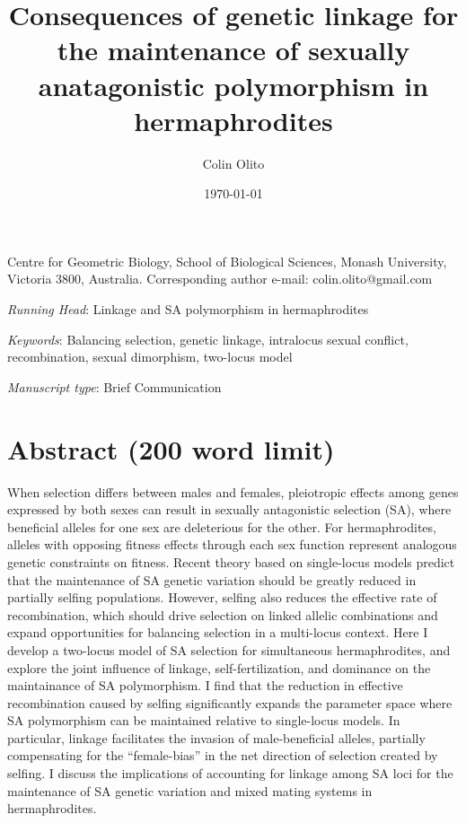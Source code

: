 \documentclass{article}
\title{Consequences of genetic linkage for the maintenance of sexually anatagonistic polymorphism in hermaphrodites}
\author{Colin Olito}
\date{\today}
\begin{document}
\maketitle


\noindent{} Centre for Geometric Biology, School of Biological Sciences, Monash University, Victoria 3800, Australia.
\noindent{} Corresponding author e-mail: colin.olito@gmail.com

\bigskip

\noindent{} \textit{Running Head}: Linkage and SA polymorphism in hermaphrodites

\bigskip

\noindent{} \textit{Keywords}: Balancing selection, genetic linkage, intralocus sexual conflict, recombination, sexual dimorphism, two-locus model

\bigskip

\noindent{} \textit{Manuscript type}: Brief Communication

\bigskip


\linenumbers
\modulolinenumbers[1]
\renewcommand\linenumberfont{\normalfont\small}


\newpage{}
\section*{Abstract (200 word limit)}

\noindent{} When selection differs between males and females, pleiotropic effects among genes expressed by both sexes can result in sexually antagonistic selection (SA), where beneficial alleles for one sex are deleterious for the other. For hermaphrodites, alleles with opposing fitness effects through each sex function represent analogous genetic constraints on fitness. Recent theory based on single-locus models predict that the maintenance of SA genetic variation should be greatly reduced in partially selfing populations. However, selfing also reduces the effective rate of recombination, which should drive selection on linked allelic combinations and expand opportunities for balancing selection in a multi-locus context. Here I develop a two-locus model of SA selection for simultaneous hermaphrodites, and explore the joint influence of linkage, self-fertilization, and dominance on the maintainance of SA polymorphism. I find that the reduction in effective recombination caused by selfing significantly expands the parameter space where SA polymorphism can be maintained relative to single-locus models. In particular, linkage facilitates the invasion of male-beneficial alleles, partially compensating for the ``female-bias'' in the net direction of selection created by selfing. I discuss the implications of accounting for linkage among SA loci for the maintenance of SA genetic variation and mixed mating systems in hermaphrodites.
\end{document}
